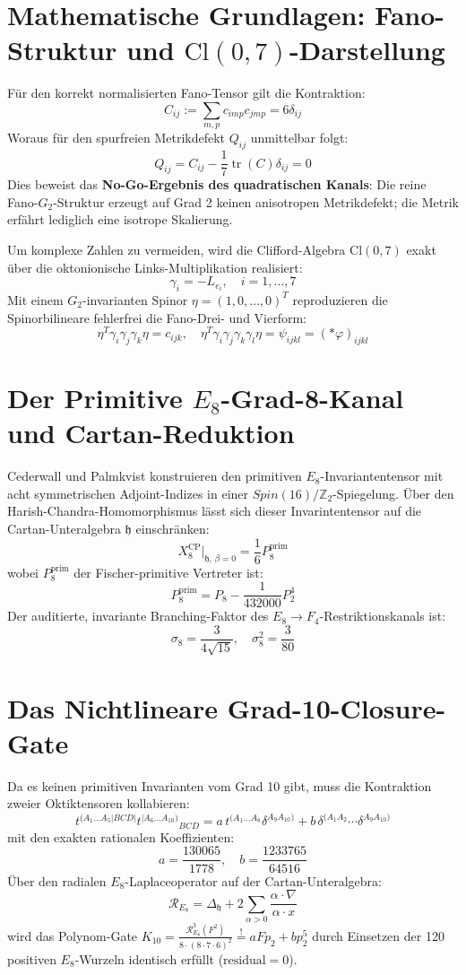 \documentclass[11pt,a4paper]{article}
\begin{document}
\section{Mathematische Grundlagen: Fano-Struktur und $\text{Cl}(0,7)$-Darstellung}
Für den korrekt normalisierten Fano-Tensor gilt die Kontraktion:
$$C_{ij} := \sum_{m,p} c_{imp} c_{jmp} = 6\delta_{ij}$$
Woraus für den spurfreien Metrikdefekt $Q_{ij}$ unmittelbar folgt:
$$Q_{ij} = C_{ij} - \frac{1}{7}\operatorname{tr}(C)\delta_{ij} = 0$$
Dies beweist das \textbf{No-Go-Ergebnis des quadratischen Kanals}: Die reine Fano-$G_2$-Struktur erzeugt auf Grad 2 keinen anisotropen Metrikdefekt; die Metrik erfährt lediglich eine isotrope Skalierung.

Um komplexe Zahlen zu vermeiden, wird die Clifford-Algebra $\text{Cl}(0,7)$ exakt über die oktonionische Links-Multiplikation realisiert:
$$\gamma_i = -L_{e_i}, \quad i = 1, \dots, 7$$
Mit einem $G_2$-invarianten Spinor $\eta = (1, 0, \dots, 0)^T$ reproduzieren die Spinorbilineare fehlerfrei die Fano-Drei- und Vierform:
$$\eta^T \gamma_i \gamma_j \gamma_k \eta = c_{ijk}, \quad \eta^T \gamma_i \gamma_j \gamma_k \gamma_l \eta = \psi_{ijkl} = (*\varphi)_{ijkl}$$

\section{Der Primitive $E_8$-Grad-8-Kanal und Cartan-Reduktion}
Cederwall und Palmkvist konstruieren den primitiven $E_8$-Invariantentensor mit acht symmetrischen Adjoint-Indizes in einer $Spin(16)/\mathbb{Z}_2$-Spiegelung. Über den Harish-Chandra-Homomorphismus lässt sich dieser Invarintentensor auf die Cartan-Unteralgebra $\mathfrak{h}$ einschränken:
$$X_8^{\text{CP}}\big|_{\mathfrak{h}, \, \beta=0} = \frac{1}{6} P_8^{\text{prim}}$$
wobei $P_8^{\text{prim}}$ der Fischer-primitive Vertreter ist:
$$P_8^{\text{prim}} = P_8 - \frac{1}{432000} P_2^4$$
Der auditierte, invariante Branching-Faktor des $E_8 \to F_4$-Restriktionskanals ist:
$$\sigma_8 = \frac{3}{4\sqrt{15}}, \quad \sigma_8^2 = \frac{3}{80}$$

\section{Das Nichtlineare Grad-10-Closure-Gate}
Da es keinen primitiven Invarianten vom Grad 10 gibt, muss die Kontraktion zweier Oktiktensoren kollabieren:
$$t^{(A_1 \dots A_5 | BCD |} t^{|A_6 \dots A_{10})} {}_{BCD} = a \, t^{(A_1 \dots A_8} \delta^{A_9 A_{10})} + b \, \delta^{(A_1 A_2} \cdots \delta^{A_9 A_{10})}$$
mit den exakten rationalen Koeffizienten:
$$a = \frac{130065}{1778}, \quad b = \frac{1233765}{64516}$$
Über den radialen $E_8$-Laplaceoperator auf der Cartan-Unteralgebra:
$$\mathcal{R}_{E_8} = \Delta_{\mathfrak{h}} + 2\sum_{\alpha>0} \frac{\alpha \cdot \nabla}{\alpha \cdot x}$$
wird das Polynom-Gate $K_{10} = \frac{\mathcal{R}_{E_8}^3 (F^2)}{8 \cdot (8 \cdot 7 \cdot 6)^2} \stackrel{!}{=} a F p_2 + b p_2^5$ durch Einsetzen der 120 positiven $E_8$-Wurzeln identisch erfüllt ($\text{residual} = 0$).
\end{document}
